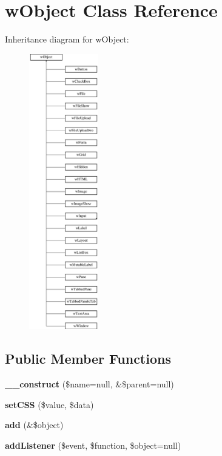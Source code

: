 \hypertarget{classwObject}{
\section{wObject Class Reference}
\label{classwObject}
}
Inheritance diagram for wObject:\begin{figure}[H]
\begin{center}
\leavevmode
\includegraphics[height=12.000000cm]{classwObject}
\end{center}
\end{figure}
\subsection*{Public Member Functions}
\begin{DoxyCompactItemize}
\item 
\hypertarget{classwObject_a731a6cc6edc0a637da1d0578af14882e}{
{\bfseries \_\-\_\-construct} (\$name=null, \&\$parent=null)}
\label{classwObject_a731a6cc6edc0a637da1d0578af14882e}

\item 
\hypertarget{classwObject_a760d41e6c19257d292817b37c4920500}{
{\bfseries setCSS} (\$value, \$data)}
\label{classwObject_a760d41e6c19257d292817b37c4920500}

\item 
\hypertarget{classwObject_aaef0eb3d21c462c6028a24b956ffcd2f}{
{\bfseries add} (\&\$object)}
\label{classwObject_aaef0eb3d21c462c6028a24b956ffcd2f}

\item 
\hypertarget{classwObject_a047b73bd922b26d9567ebdafaefb36d5}{
{\bfseries addListener} (\$event, \$function, \$object=null)}
\label{classwObject_a047b73bd922b26d9567ebdafaefb36d5}

\end{DoxyCompactItemize}
